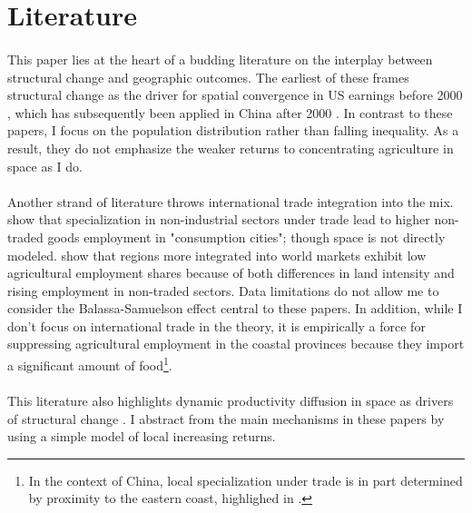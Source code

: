 \documentclass[]{article}
\theoremstyle{plain}
\begin{document}
\section{Literature}\label{section:literature}
\paragraph*{}
This paper lies at the heart of a budding literature on the interplay between structural change and geographic outcomes. The earliest of these frames structural change as the driver for spatial convergence in US earnings before 2000 \citep{casellicoleman}, which has subsequently been applied in China after 2000 \citep{hao2020}. In contrast to these papers, I focus on the population distribution rather than falling inequality. As a result, they do not emphasize the weaker returns to concentrating agriculture in space as I do. 
\paragraph*{}
Another strand of literature throws international trade integration into the mix. \citet{urbwoindustrialization} show that specialization in non-industrial sectors under trade lead to higher non-traded goods employment in "consumption cities"; though space is not directly modeled. \citet{rfargentina} show that regions more integrated into world markets exhibit low agricultural employment shares because of both differences in land intensity and rising employment in non-traded sectors. Data limitations do not allow me to consider the Balassa-Samuelson effect central to these papers. In addition, while I don't focus on international trade in the theory, it is empirically a force for suppressing agricultural employment in the coastal provinces because they import a significant amount of food\footnote{In the context of China, local specialization under trade is in part determined by proximity to the eastern coast, highlighed in \cite{cosarfagjelbaum}.}.
\paragraph*{}
This literature also highlights dynamic productivity diffusion in space as drivers of structural change \citep{spatdev}  \citep{delventhalglobenet}. I abstract from the main mechanisms in these papers by using a simple model of local increasing returns. 
\end{document}
